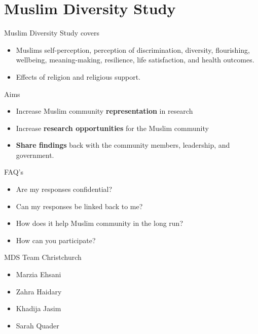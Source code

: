 \documentclass[
  ignorenonframetext,
  aspectratio=169,
]{beamer}
\providecommand{\tightlist}{%
  \setlength{\itemsep}{0pt}\setlength{\parskip}{0pt}}\usepackage{longtable,booktabs,array}
\begin{document}
\section{Muslim Diversity Study}\label{muslim-diversity-study}

\begin{frame}{Muslim Diversity Study covers}
\label{muslim-diversity-study-covers}
\begin{itemize}[<+->]
\tightlist
\item
  Muslims self-perception, perception of discrimination, diversity,
  flourishing, wellbeing, meaning-making, resilience, life satisfaction,
  and health outcomes.
\item
  Effects of religion and religious support.
\end{itemize}
\end{frame}

\begin{frame}{Aims}
\label{aims}
\begin{itemize}[<+->]
\tightlist
\item
  Increase Muslim community \textbf{representation} in research
\item
  Increase \textbf{research opportunities} for the Muslim community
\item
  \textbf{Share findings} back with the community members, leadership,
  and government.
\end{itemize}
\end{frame}

\begin{frame}{FAQ's}
\label{faqs}
\begin{itemize}[<+->]
\tightlist
\item
  Are my responses confidential?
\item
  Can my responses be linked back to me?
\item
  How does it help Muslim community in the long run?
\item
  How can you participate?
\end{itemize}
\end{frame}

\begin{frame}{MDS Team Christchurch}
\label{mds-team-christchurch}
\begin{itemize}
\tightlist
\item
  Marzia Ehsani
\item
  Zahra Haidary
\item
  Khadija Jasim
\item
  Sarah Quader
\end{itemize}
\end{frame}
\end{document}
